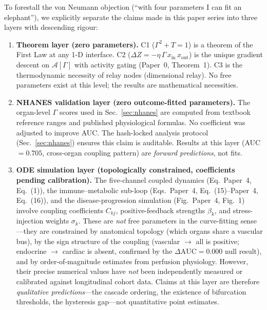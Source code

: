 \documentclass[aps,pre,twocolumn,superscriptaddress,floatfix]{revtex4-2}
\begin{document}
\begin{remark}
\label{rem:epistemic-layers}
To forestall the von Neumann objection
(``with four parameters I can fit an elephant''),
we explicitly separate the claims made in this
paper series into three layers with descending
rigour:

\begin{enumerate}
  \item \textbf{Theorem layer (zero parameters).}
    C1 ($\Gamma^2 + T = 1$) is a theorem of the
    First Law at any 1-D interface.
    C2 ($\Delta Z = -\eta\,\Gamma\,x_{\text{in}}\,
    x_{\text{out}}$) is the unique gradient descent
    on $\mathcal{A}[\Gamma]$ with activity gating
    (Paper~0, Theorem~1).
    C3 is the thermodynamic necessity of
    relay nodes (dimensional relay).
    No free parameters exist at this level;
    the results are mathematical necessities.

  \item \textbf{NHANES validation layer
    (zero outcome-fitted parameters).}
    The organ-level $\Gamma$ scores used in
    Sec.~\ref{sec:nhanes} are computed from
    textbook reference ranges and published
    physiological formulas.
    No coefficient was adjusted to improve AUC.
    The hash-locked analysis protocol
    (Sec.~\ref{sec:nhanes}) ensures this claim
    is auditable.
    Results at this layer (AUC $= 0.705$,
    cross-organ coupling pattern) are
    \emph{forward predictions}, not fits.

  \item \textbf{ODE simulation layer
    (topologically constrained, coefficients
    pending calibration).}
    The five-channel coupled dynamics
    (Eq.~Paper~4, Eq.~(1)), the
    immune--metabolic sub-loop
    (Eqs.~Paper~4, Eq.~(15)--Paper~4, Eq.~(16)),
    and the disease-progression simulation
    (Fig.~Paper~4, Fig.~1) involve
    coupling coefficients $C_{kj}$,
    positive-feedback strengths $\beta_k$, and
    stress-injection weights $\sigma_k$.
    These are \emph{not} free parameters in
    the curve-fitting sense---they are
    constrained by anatomical topology
    (which organs share a vascular bus),
    by the sign structure of the coupling
    (vascular $\to$ all is positive;
    endocrine $\to$ cardiac is absent,
    confirmed by the $\Delta\text{AUC} = 0.000$
    null result), and by order-of-magnitude
    estimates from perfusion physiology.
    However, their precise numerical values
    have \emph{not} been independently measured
    or calibrated against longitudinal cohort data.
    Claims at this layer are therefore
    \emph{qualitative predictions}---the
    cascade ordering, the existence of
    bifurcation thresholds, the hysteresis
    gap---not quantitative point estimates.


\end{enumerate}
\end{remark}
\end{document}
